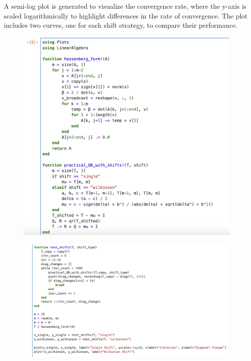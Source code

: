 \documentclass{article}
\begin{document}
A semi-log plot is generated to visualize the convergence rate, where the y-axis is scaled logarithmically to highlight differences in the rate of convergence. The plot includes two curves, one for each shift strategy, to compare their performance.

\begin{figure}[H]
    \centering
    \includegraphics[width=0.75\linewidth]{Image 4-8-24 at 00.30.jpeg}
\end{figure}
\begin{figure}[H]
    \centering
    \includegraphics[width=0.75\linewidth]{Image 4-8-24 at 00.30 (1).jpeg}
\end{figure}
\end{document}
